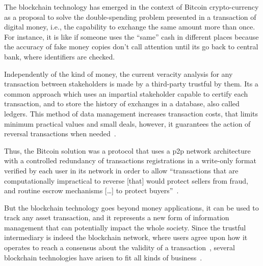 
The blockchain technology has emerged in the context of Bitcoin crypto-currency as a proposal to solve the double-spending problem presented in a transaction of digital money, i.e., the capability to exchange the same amount more than once.
For instance, it is like if someone uses the ``same'' cash in different places because the accuracy of fake money copies don't call attention until its go back to central bank, where identifiers are checked. %

Independently of the kind of money, the current veracity analysis for any transaction between stakeholders is made by a third-party trustful by them.
Its a common approach which uses an impartial stakeholder capable to certify each transaction, and to store the history of exchanges in a database, also called ledgers.
This method of data management increases transaction costs, that limits minimum practical values and small deals, however, it guarantees the action of reversal transactions when needed~\cite{satoshi2009}.

Thus, the Bitcoin solution was a protocol that uses a \gls{p2p} network architecture
with a controlled redundancy of transactions registrations
in a write-only format
verified by each user in its network in order to allow
``transactions that are computationally impractical to reverse [that] would protect sellers from fraud,
and routine escrow mechanisms [\dots] to protect buyers''~\cite{satoshi2009}.

But the blockchain technology goes beyond money applications, it can be used to track any asset transaction, and it represents a new form of information management that can potentially impact the whole society.
Since the trustful intermediary is indeed the blockchain network, where users agree upon how it operates to reach a consensus about the validity of a transaction~\cite{swan2015blockchain},
several blockchain technologies have arisen to fit all kinds of business~\cite{gartner}.

